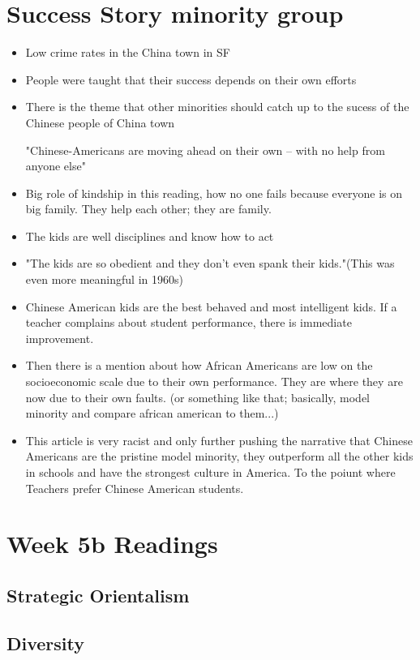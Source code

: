 \documentclass{article}
\begin{document}
  \section{Success Story minority group}
  \begin{itemize}
    \item Low crime rates in the China town in SF
    \item People were taught that their success depends on their own efforts
    \item There is the theme that other minorities should catch up 
      to the sucess of the Chinese people of China town

      "Chinese-Americans are moving ahead on their own -- with no help from anyone else"
    \item Big role of kindship in this reading, how no one fails
      because everyone is on big family. They help each other; they are family.
    \item The kids are well disciplines and know how to act
    \item "The kids are so obedient and they don't even spank their kids."(This was even more meaningful in 1960s)
    \item Chinese American kids are the best behaved and most intelligent kids.
      If a teacher complains about student performance, there is immediate improvement.
    \item Then there is a mention about how African Americans are low on the socioeconomic scale
      due to their own performance. They are where they are now due to their own faults. 
      (or something like that; basically, model minority and compare african american to them...)
    \item This article is very racist and only further pushing the narrative that Chinese Americans
      are the pristine model minority, they outperform all the other kids in schools and have
      the strongest culture in America. To the poiunt where Teachers prefer Chinese American students.
  \end{itemize}

  \section*{Week 5b Readings}
  \subsection{Strategic Orientalism}
  \subsection{Diversity}
\end{document}
